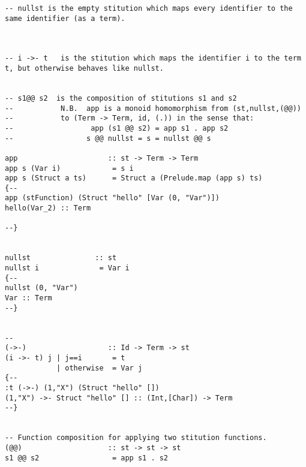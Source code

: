 \documentclass[thesis-solanki.tex]{files}
\begin{document}
\begin{verbatim}
-- nullst is the empty stitution which maps every identifier to the same identifier (as a term).



-- i ->- t   is the stitution which maps the identifier i to the term t, but otherwise behaves like nullst.


-- s1@@ s2  is the composition of stitutions s1 and s2
--           N.B.  app is a monoid homomorphism from (st,nullst,(@@))
--           to (Term -> Term, id, (.)) in the sense that:
--                  app (s1 @@ s2) = app s1 . app s2
--                 s @@ nullst = s = nullst @@ s

app                     :: st -> Term -> Term
app s (Var i)            = s i
app s (Struct a ts)      = Struct a (Prelude.map (app s) ts)
{--
app (stFunction) (Struct "hello" [Var (0, "Var")])
hello(Var_2) :: Term

--}


nullst               :: st
nullst i              = Var i
{--
nullst (0, "Var")
Var :: Term
--}


--
(->-)                   :: Id -> Term -> st
(i ->- t) j | j==i       = t
            | otherwise  = Var j
{--
:t (->-) (1,"X") (Struct "hello" [])
(1,"X") ->- Struct "hello" [] :: (Int,[Char]) -> Term
--}


-- Function composition for applying two stitution functions.
(@@)                    :: st -> st -> st
s1 @@ s2                 = app s1 . s2
\end{verbatim}
\end{document}
